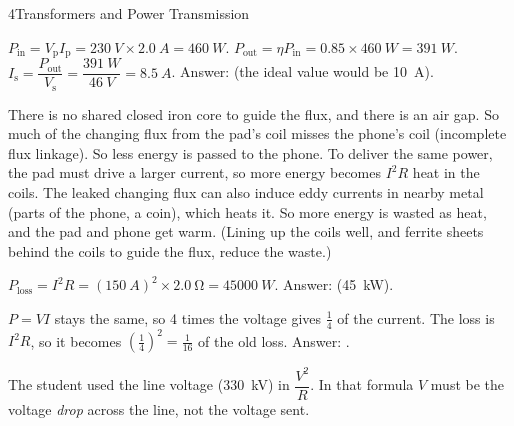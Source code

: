 \begin{chapteranswers}{4}{Transformers and Power Transmission}
\begin{markingcriteria}
        \end{markingcriteria}
  \item $P_\mathrm{in} = V_\mathrm{p}I_\mathrm{p} = \qty{230}{V} \times \qty{2.0}{A}
        = \qty{460}{W}$. $P_\mathrm{out} = \eta P_\mathrm{in} = 0.85 \times \qty{460}{W}
        = \qty{391}{W}$. $I_\mathrm{s} = \dfrac{P_\mathrm{out}}{V_\mathrm{s}}
        = \dfrac{\qty{391}{W}}{\qty{46}{V}} = \qty{8.5}{A}$.
        Answer:  (the ideal value would be
        \qty{10}{A}).
  \item There is no shared closed iron core to guide the flux, and there is an air gap.
        So much of the changing flux from the pad's coil misses the phone's coil
        (incomplete flux linkage). So less energy is passed to the phone. To deliver
        the same power, the pad must drive a larger current, so more energy becomes
        $I^2R$ heat in the coils. The leaked changing flux can also induce eddy currents
        in nearby metal (parts of the phone, a coin), which heats it. So more energy is
        wasted as heat, and the pad and phone get warm. (Lining up the coils well, and
        ferrite sheets behind the coils to guide the flux, reduce the waste.)
        \begin{markingcriteria}
        \end{markingcriteria}
  \item $P_\mathrm{loss} = I^2R = (\qty{150}{A})^2 \times \qty{2.0}{\ohm}
        = \qty{45000}{W}$. Answer: 
        (\qty{45}{kW}).
  \item $P = VI$ stays the same, so 4 times the voltage gives $\tfrac{1}{4}$ of the
        current. The loss is $I^2R$, so it becomes $\left(\tfrac{1}{4}\right)^2
        = \tfrac{1}{16}$ of the old loss. Answer: .
  \item The student used the line voltage (\qty{330}{kV}) in $\dfrac{V^2}{R}$. In that
        formula $V$ must be the voltage \emph{drop} across the line, not the voltage sent.

\end{chapteranswers}

